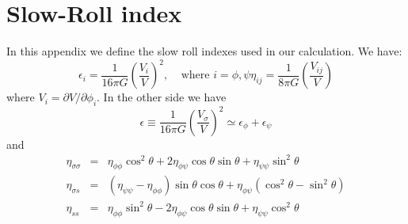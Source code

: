 \documentclass[a4paper,fleqn,usenatbib,useAMS]{mnras}
\begin{document}
\section{Slow-Roll index}
In this appendix we define the slow roll indexes used in our calculation. We have:
\begin{subequations}
\begin{equation}
\epsilon_i = \frac{1}{16 \pi G}\left(\frac{V_i}{V}\right)^2, \ \ \ \ \ \text{where $i=\phi,\psi$}
\end{equation}
\begin{equation}
\eta_{ij}=\frac{1}{8\pi G}\left(\frac{V_{ij}}{V}\right)
\end{equation}
\end{subequations}
where $V_i = \partial V/\partial \phi_i$. In the other side we have
\begin{equation}
\epsilon \equiv \frac{1}{16\pi G}\left(\frac{V_\sigma}{V}\right)^2\simeq \epsilon_\phi+\epsilon_\psi
\end{equation}
and
\begin{eqnarray}
\eta_{\sigma\sigma}&=&\eta_{\phi\phi}\cos^2\theta + 2\eta_{\phi\psi}\cos\theta\sin\theta+\eta_{\psi\psi}\sin^2\theta\nonumber \\
\eta_{\sigma s}&=&(\eta_{\psi\psi}-\eta_{\phi\phi})\sin\theta\cos\theta + \eta_{\phi\psi}(\cos^2\theta-\sin^2\theta)\\
\eta_{ss}&=&\eta_{\phi\phi}\sin^2\theta - 2\eta_{\phi\psi}\cos\theta\sin\theta+\eta_{\psi\psi}\cos^2\theta\nonumber 
\end{eqnarray}
\end{document}
